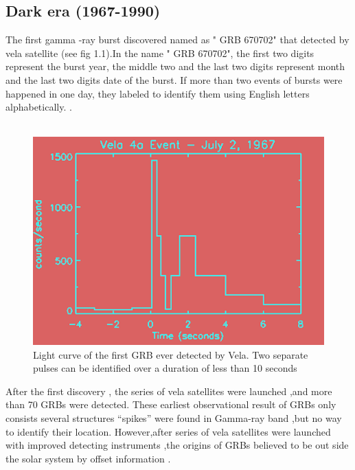 \subsection{Dark era (1967-1990)}
 The first gamma -ray burst discovered  named as " GRB 670702" that  detected by vela satellite (see fig 1.1).In the name " GRB 670702", the first two digits represent the burst year, the middle two  and the last two digits represent month and the last two digits date of the burst. If more than two events of bursts were happened in one day, they labeled to identify them  using  English letters alphabetically. \citep {4} \citep { 5}.\\\\
\begin{center}
\begin{figure}[h]
\includegraphics[scale=0.2]{Figures/fig1.png}
\caption{Light curve of the first GRB ever detected by Vela. Two separate pulses can be identified over a duration of less than 10 seconds \citep{4}}
\end{figure}
\end{center}
After the first discovery , the series of vela satellites were launched ,and more than 70 GRBs were detected. These earliest observational result of GRBs only consists several structures “spikes” were found in Gamma-ray band ,but no way to identify their location. However,after series of  vela satellites were launched with improved detecting instruments ,the origins of GRBs believed to be out side the solar system by offset information \citep{4} \citep { 5}.\\\\
